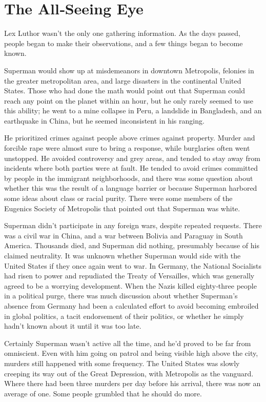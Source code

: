 \hypertarget{the-allseeing-eye}{%
\chapter{The All‐Seeing Eye}\label{the-allseeing-eye}}

Lex Luthor wasn't the only one gathering information. As the days
passed, people began to make their observations, and a few things began
to become known.

Superman would show up at misdemeanors in downtown Metropolis, felonies
in the greater metropolitan area, and large disasters in the continental
United States. Those who had done the math would point out that Superman
could reach any point on the planet within an hour, but he only rarely
seemed to use this ability; he went to a mine collapse in Peru, a
landslide in Bangladesh, and an earthquake in China, but he seemed
inconsistent in his ranging.

He prioritized crimes against people above crimes against property.
Murder and forcible rape were almost sure to bring a response, while
burglaries often went unstopped. He avoided controversy and grey areas,
and tended to stay away from incidents where both parties were at fault.
He tended to avoid crimes committed by people in the immigrant
neighborhoods, and there was some question about whether this was the
result of a language barrier or because Superman harbored some ideas
about class or racial purity. There were some members of the Eugenics
Society of Metropolis that pointed out that Superman was white.

Superman didn't participate in any foreign wars, despite repeated
requests. There was a civil war in China, and a war between Bolivia and
Paraguay in South America. Thousands died, and Superman did nothing,
presumably because of his claimed neutrality. It was unknown whether
Superman would side with the United States if they once again went to
war. In Germany, the National Socialists had risen to power and
repudiated the Treaty of Versailles, which was generally agreed to be a
worrying development. When the Nazis killed eighty‐three people in a
political purge, there was much discussion about whether Superman's
absence from Germany had been a calculated effort to avoid becoming
embroiled in global politics, a tacit endorsement of their politics, or
whether he simply hadn't known about it until it was too late.

Certainly Superman wasn't active all the time, and he'd proved to be far
from omniscient. Even with him going on patrol and being visible high
above the city, murders still happened with some frequency. The United
States was slowly creeping its way out of the Great Depression, with
Metropolis as the vanguard. Where there had been three murders per day
before his arrival, there was now an average of one. Some people
grumbled that he should do more.

